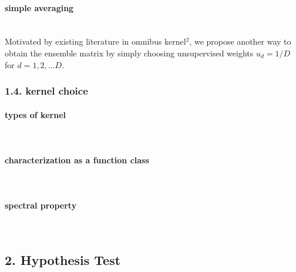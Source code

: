 \documentclass[11pt]{article}
\begin{document}
\paragraph{simple averaging}\mbox{}\\
Motivated by existing literature in omnibus kernel$^{2}$, we propose another way to obtain the ensemble matrix by simply choosing unsupervised weights $u_d=1/D$ for $d=1,2,...D$.

\subsubsection*{{1.4. kernel choice}}
\paragraph{types of kernel}\mbox{}\\
\paragraph{characterization as a function class}\mbox{}\\
\paragraph{spectral property}\mbox{}\\
\subsection*{{2. Hypothesis Test}}
\setcounter{equation}{0}
\renewcommand{\theequation}{2.2.\arabic{equation}}
\end{document}
